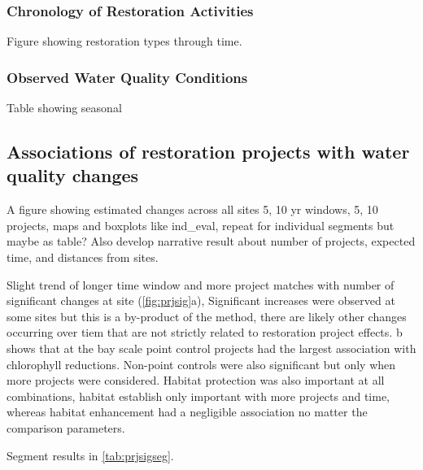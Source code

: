 \documentclass[]{article}
\begin{document}
\hypertarget{chronology-of-restoration-activities}{%
\subsubsection{Chronology of Restoration
Activities}\label{chronology-of-restoration-activities}}

Figure showing restoration types through time.

\hypertarget{observed-water-quality-conditions}{%
\subsubsection{Observed Water Quality
Conditions}\label{observed-water-quality-conditions}}

Table showing seasonal

\hypertarget{associations-of-restoration-projects-with-water-quality-changes}{%
\subsection{Associations of restoration projects with water quality
changes}\label{associations-of-restoration-projects-with-water-quality-changes}}

A figure showing estimated changes across all sites 5, 10 yr windows, 5,
10 projects, maps and boxplots like ind\_eval, repeat for individual
segments but maybe as table? Also develop narrative result about number
of projects, expected time, and distances from sites.

Slight trend of longer time window and more project matches with number
of significant changes at site (\cref{fig:prjsig}a), Significant
increases were observed at some sites but this is a by-product of the
method, there are likely other changes occurring over tiem that are not
strictly related to restoration project effects. b
shows that at the bay scale point control projects had the largest
association with chlorophyll reductions. Non-point controls were also
significant but only when more projects were considered. Habitat
protection was also important at all combinations, habitat establish
only important with more projects and time, whereas habitat enhancement
had a negligible association no matter the comparison parameters.

Segment results in \cref{tab:prjsigseg}.
\end{document}
